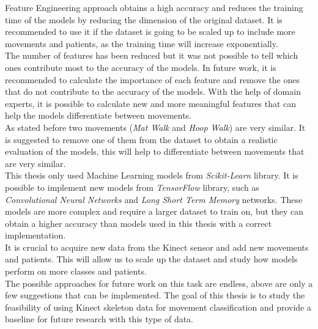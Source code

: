         Feature Engineering approach obtains a high accuracy and reduces the training time of the models by reducing the dimension of the original dataset. It is recommended to use it if the dataset is going to be scaled up to include more movements and patients, as the training time will increase exponentially.\\
        The number of features has been reduced but it was not possible to tell which ones contribute most to the accuracy of the models. In future work, it is recommended to calculate the importance of each feature and remove the ones that do not contribute to the accuracy of the models. With the help of domain experts, it is possible to calculate new and more meaningful features that can help the models differentiate between movements. \\
        As stated before two movements (\textit{Mat Walk} and \textit{Hoop Walk}) are very similar. It is suggested to remove one of them from the dataset to obtain a realistic evaluation of the models, this will help to differentiate between movements that are very similar.\\
        
        This thesis only used Machine Learning models from \textit{Scikit-Learn} library. It is possible to implement new models from \textit{TensorFlow} library, such as \textit{Convolutional Neural Networks} and \textit{Long Short Term Memory} networks. These models are more complex and require a larger dataset to train on, but they can obtain a higher accuracy than models used in this thesis with a correct implementation. \\
        It is crucial to acquire new data from the Kinect sensor and add new movements and patients. This will allow us to scale up the dataset and study how models perform on more classes and patients. \\

        The possible approaches for future work on this task are endless, above are only a few suggestions that can be implemented. The goal of this thesis is to study the feasibility of using Kinect skeleton data for movement classification and provide a baseline for future research with this type of data. \\
    
    \cleardoublepage
